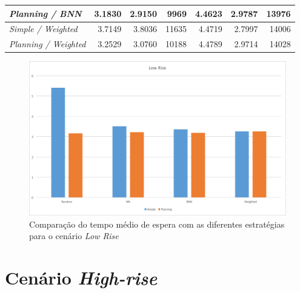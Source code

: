 \begin{table}[htb!]
\begin{tabular}{|l|r|r|r|r|r|r|}
\textit{Planning / BNN}           & 3.1830                              & 2.9150                               & 9969                                & \cellcolor[HTML]{67FD9A}4.4623                        & \cellcolor[HTML]{FFFFFF}2.9787                        & \cellcolor[HTML]{67FD9A}13976                        \\ \hline
\textit{Simple / Weighted}        & 3.7149                              & 3.8036                               & 11635                               & 4.4719                                                & \cellcolor[HTML]{67FD9A}2.7997                        & 14006                                                \\ \hline
\textit{Planning / Weighted}      & 3.2529                              & 3.0760                               & 10188                               & 4.4789                                                & 2.9714                                                & 14028                                                \\ \hline
\end{tabular}
\end{table}

\begin{figure}[htb]
  \centering
  \includegraphics[scale=0.5]{img/chart-averages-low-rise}
  \caption{Comparação do tempo médio de espera com as diferentes estratégias
    para o cenário \textit{Low Rise}}
  \label{fig:result:average:low-rise}
\end{figure}

\section{Cenário \textit{High-rise}}

